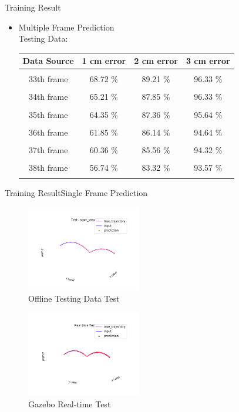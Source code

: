 \documentclass{beamer}
\begin{document}
	\begin{frame}{Training Result}
	\begin{itemize}
	\item {Multiple Frame Prediction \\	{\color{blue}Testing Data}:}
	\begin{center}
	\begin{tabular}{ c c c c }
	\hline
	\rowcolor{LightCyan}
	Data Source & 1 cm error & 2 cm error & 3 cm error \\
	\hline \\[-1em]
	33th frame & 68.72 \% & 89.21 \% & 96.33 \% \\ \\[-1em]
	34th frame & 65.21 \% & 87.85 \% & 96.33 \% \\ \\[-1em]
	35th frame & 64.35 \% & 87.36 \% & 95.64 \% \\ \\[-1em]
	36th frame & 61.85 \% & 86.14 \% & 94.64 \% \\ \\[-1em]
	37th frame & 60.36 \% & 85.56 \% & 94.32 \% \\ \\[-1em]
	38th frame & 56.74 \% & 83.32 \% & 93.57 \% \\ \\[-1em]
	\hline
	\end{tabular}
	\end{center}
	\end{itemize}
	\end{frame}   
	
	\begin{frame}{Training Result}{Single Frame Prediction}
	\begin{minipage}{5.5cm}
	\begin{figure}
	\includegraphics[width=5cm]{test_single_1.png}
    \caption{Offline Testing Data Test}
	\end{figure}
	\end{minipage}
	\begin{minipage}{5.5cm}
	\begin{figure}
	\includegraphics[width=5cm]{s_real_time_test.png}
	\caption{Gazebo Real-time Test}
	\end{figure}
	\end{minipage}	
	\end{frame}
	
\end{document}
